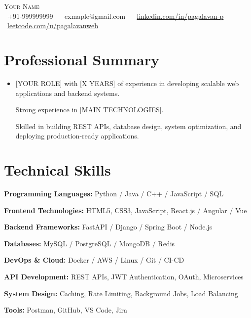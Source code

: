 \documentclass[letterpaper,11pt]{article}
\newcommand{\resumeItem}[1]{\item\small{{#1 \vspace{-2pt}}}}
\newcommand{\resumeSubHeadingListStart}{\begin{itemize}[leftmargin=0.0in, label={}]}
\newcommand{\resumeSubHeadingListEnd}{\end{itemize}}
\begin{document}
\begin{center}
    {\Huge \scshape Your Name} \\ \vspace{2pt}
    \small
    \faPhone\ +91-999999999 ~
    \faEnvelope\ exmaple@gmail.com ~
    \faLinkedin\ \href{https://www.linkedin.com/in/pagalavan-p-713b13204/}{linkedin.com/in/pagalavan-p} ~
    \faCode\ \href{https://leetcode.com/u/pagalavanweb/}{leetcode.com/u/pagalavanweb}
\end{center}

\section{Professional Summary}

\resumeSubHeadingListStart

\resumeItem{

[YOUR ROLE] with [X YEARS] of experience in developing scalable web applications and backend systems.

Strong experience in [MAIN TECHNOLOGIES].

Skilled in building REST APIs, database design, system optimization, and deploying production-ready applications.

}

\resumeSubHeadingListEnd


\section{Technical Skills}

\begin{itemize}[leftmargin=0.15in, label={}, itemsep=2pt]

\small{

\item \textbf{Programming Languages:} Python / Java / C++ / JavaScript / SQL

\item \textbf{Frontend Technologies:} HTML5, CSS3, JavaScript, React.js / Angular / Vue

\item \textbf{Backend Frameworks:} FastAPI / Django / Spring Boot / Node.js

\item \textbf{Databases:} MySQL / PostgreSQL / MongoDB / Redis

\item \textbf{DevOps \& Cloud:} Docker / AWS / Linux / Git / CI-CD

\item \textbf{API Development:} REST APIs, JWT Authentication, OAuth, Microservices

\item \textbf{System Design:} Caching, Rate Limiting, Background Jobs, Load Balancing

\item \textbf{Tools:} Postman, GitHub, VS Code, Jira

}

\end{itemize}
\end{document}

